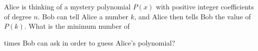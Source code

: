Alice is thinking of a mystery polynomial $P(x)$ with positive integer coefficients of degree $n$. Bob can tell Alice a number $k$, and Alice then tells Bob the value of $P(k)$. What is the minimum number of

times Bob can ask in order to guess Alice's polynomial?
